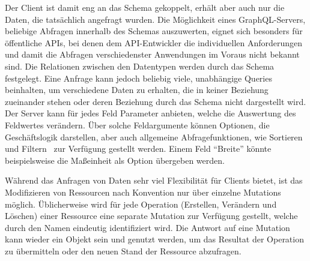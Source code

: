 Der Client ist damit eng an das Schema gekoppelt, erhält aber auch nur die Daten, die tatsächlich angefragt wurden.
Die Möglichkeit eines GraphQL-Servers, beliebige Abfragen innerhalb des Schemas auszuwerten, eignet sich besonders für öffentliche APIs, bei denen dem API-Entwickler die individuellen Anforderungen und damit die Abfragen verschiedenster Anwendungen im Voraus nicht bekannt sind.
Die Relationen zwischen den Datentypen werden durch das Schema festgelegt.
Eine Anfrage kann jedoch beliebig viele, unabhängige Queries beinhalten, \zB{} um verschiedene Daten zu erhalten, die in keiner Beziehung zueinander stehen oder deren Beziehung durch das Schema nicht dargestellt wird.
Der Server kann für jedes Feld Parameter anbieten, welche die Auswertung des Feldwertes verändern.
Über solche Feldargumente können Optionen, die Geschäftslogik darstellen, aber auch allgemeine Abfragefunktionen, wie \zB{} Sortieren~\cite[vgl.][]{GraphQL-OrderBy} und Filtern~\cite[vgl.][]{GraphQL-Filter} zur Verfügung gestellt werden.
Einem Feld \enquote{Breite} könnte beispielsweise die Maßeinheit als Option übergeben werden.
\par
Während das Anfragen von Daten sehr viel Flexibilität für Clients bietet, ist das Modifizieren von Ressourcen nach Konvention nur über einzelne Mutations möglich.
Üblicherweise wird für jede Operation (Erstellen, Verändern und Löschen) einer Ressource eine separate Mutation zur Verfügung gestellt, welche durch den Namen eindeutig identifiziert wird.
Die Antwort auf eine Mutation kann wieder ein Objekt sein und genutzt werden, um das Resultat der Operation zu übermitteln oder den neuen Stand der Ressource abzufragen.
\par


